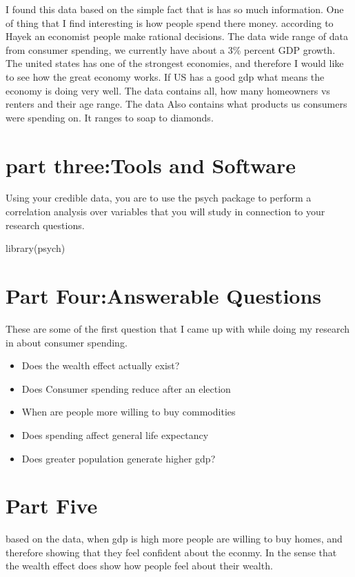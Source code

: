 \documentclass[11pt]{article}
\begin{document}
I found this data based on the simple fact that is has so much information. One of thing that I find interesting  is how people spend there money. according to Hayek an economist people make rational decisions. The data wide range of data  from consumer spending, we currently have about a 3\% percent GDP growth. The united states has one of the strongest economies, and therefore I would like to see how the great economy works. If US has a good gdp what means the economy is doing very well.  The data contains all, how many homeowners vs renters and their age range. The data Also contains what products us consumers were spending on. It ranges to soap to diamonds. 



\section{part three:Tools and Software}

Using your credible data, you are to use the psych package to perform a
correlation analysis over variables that you will study in connection to your research questions.


library(psych)


\section{Part Four:Answerable Questions}


These are some of the first question that I came up with while doing my research in about consumer spending. 
\begin{itemize}
\item Does the wealth effect actually exist? 
\item Does Consumer spending reduce after an election
\item When are people more willing to buy commodities 
\item Does spending affect general life expectancy
\item Does greater population generate higher gdp?
\end{itemize}


\section{Part Five}

based on the data, when gdp is high more people are willing to buy homes, and therefore showing that they feel confident about the econmy. In the sense that the wealth effect does show how people feel about their wealth.  
\end{document}
